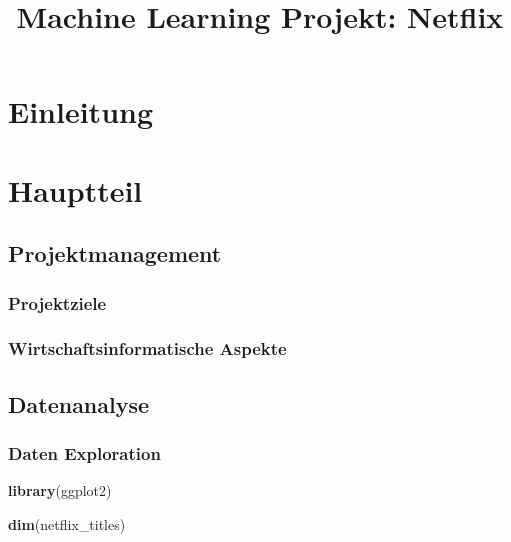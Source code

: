\documentclass[
]{article}
\title{Machine Learning Projekt: Netflix}
\author{}
\date{\vspace{-2.5em}}
\newenvironment{Shaded}{\begin{snugshade}}{\end{snugshade}}
\newcommand{\KeywordTok}[1]{\textcolor[rgb]{0.13,0.29,0.53}{\textbf{#1}}}
\newcommand{\NormalTok}[1]{#1}
\begin{document}
\maketitle

\hypertarget{einleitung}{%
\section{Einleitung}\label{einleitung}}

\hypertarget{hauptteil}{%
\section{Hauptteil}\label{hauptteil}}

\hypertarget{projektmanagement}{%
\subsection{Projektmanagement}\label{projektmanagement}}

\hypertarget{projektziele}{%
\subsubsection{Projektziele}\label{projektziele}}

\hypertarget{wirtschaftsinformatische-aspekte}{%
\subsubsection{Wirtschaftsinformatische
Aspekte}\label{wirtschaftsinformatische-aspekte}}

\hypertarget{datenanalyse}{%
\subsection{Datenanalyse}\label{datenanalyse}}

\hypertarget{daten-exploration}{%
\subsubsection{Daten Exploration}\label{daten-exploration}}

\begin{Shaded}
\begin{Highlighting}[]
\KeywordTok{library}\NormalTok{(ggplot2)}

\KeywordTok{dim}\NormalTok{(netflix_titles)}
\end{Highlighting}
\end{Shaded}
\end{document}
